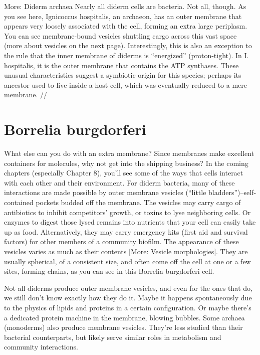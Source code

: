 \documentclass[]{book}
\begin{document}
More: Diderm archaea Nearly all diderm cells are bacteria. Not all,
though. As you see here, Ignicoccus hospitalis, an archaeon, has an
outer membrane that appears very loosely associated with the cell,
forming an extra large periplasm. You can see membrane-bound vesicles
shuttling cargo across this vast space (more about vesicles on the next
page). Interestingly, this is also an exception to the rule that the
inner membrane of diderms is ``energized'' (proton-tight). In I.
hospitalis, it is the outer membrane that contains the ATP synthases.
These unusual characteristics suggest a symbiotic origin for this
species; perhaps its ancestor used to live inside a host cell, which was
eventually reduced to a mere membrane. //

\section{Borrelia burgdorferi}\label{borrelia-burgdorferi}

What else can you do with an extra membrane? Since membranes make
excellent containers for molecules, why not get into the shipping
business? In the coming chapters (especially Chapter 8), you'll see some
of the ways that cells interact with each other and their environment.
For diderm bacteria, many of these interactions are made possible by
outer membrane vesicles (``little bladders'')--self-contained pockets
budded off the membrane. The vesicles may carry cargo of antibiotics to
inhibit competitors' growth, or toxins to lyse neighboring cells. Or
enzymes to digest those lysed remains into nutrients that your cell can
easily take up as food. Alternatively, they may carry emergency kits
(first aid and survival factors) for other members of a community
biofilm. The appearance of these vesicles varies as much as their
contents {[}More: Vesicle morphologies{]}. They are usually spherical,
of a consistent size, and often come off the cell at one or a few sites,
forming chains, as you can see in this Borrelia burgdorferi cell.

Not all diderms produce outer membrane vesicles, and even for the ones
that do, we still don't know exactly how they do it. Maybe it happens
spontaneously due to the physics of lipids and proteins in a certain
configuration. Or maybe there's a dedicated protein machine in the
membrane, blowing bubbles. Some archaea (monoderms) also produce
membrane vesicles. They're less studied than their bacterial
counterparts, but likely serve similar roles in metabolism and community
interactions.
\end{document}

